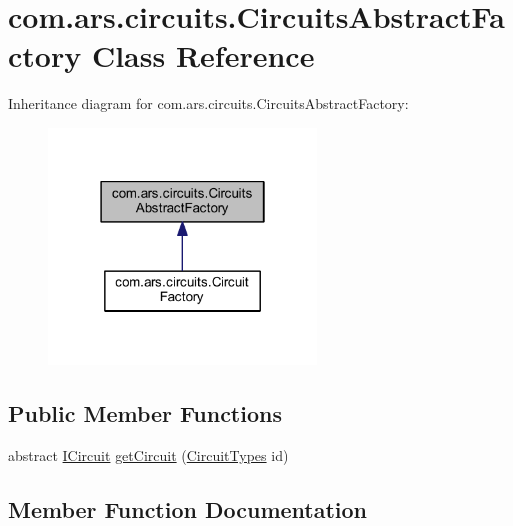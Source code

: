 \hypertarget{classcom_1_1ars_1_1circuits_1_1_circuits_abstract_factory}{}\section{com.\+ars.\+circuits.\+Circuits\+Abstract\+Factory Class Reference}
\label{classcom_1_1ars_1_1circuits_1_1_circuits_abstract_factory}


Inheritance diagram for com.\+ars.\+circuits.\+Circuits\+Abstract\+Factory\+:
\nopagebreak
\begin{figure}[H]
\begin{center}
\leavevmode
\includegraphics[width=202pt]{classcom_1_1ars_1_1circuits_1_1_circuits_abstract_factory__inherit__graph}
\end{center}
\end{figure}
\subsection*{Public Member Functions}
\begin{DoxyCompactItemize}
\item 
abstract \hyperlink{interfacecom_1_1ars_1_1circuits_1_1_i_circuit}{I\+Circuit} \hyperlink{classcom_1_1ars_1_1circuits_1_1_circuits_abstract_factory_a626deadf5570c3d0e23c2b57627578e9}{get\+Circuit} (\hyperlink{enumcom_1_1ars_1_1circuits_1_1_circuit_types}{Circuit\+Types} id)
\end{DoxyCompactItemize}


\subsection{Member Function Documentation}
\hypertarget{classcom_1_1ars_1_1circuits_1_1_circuits_abstract_factory_a626deadf5570c3d0e23c2b57627578e9}{}\label{classcom_1_1ars_1_1circuits_1_1_circuits_abstract_factory_a626deadf5570c3d0e23c2b57627578e9} 

